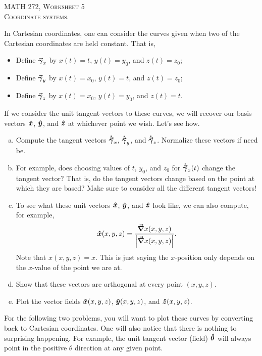 \documentclass[12pt]{article} %
\begin{document}
\begin{center}
   \textsc{\large MATH 272, Worksheet 5}\\
   \textsc{Coordinate systems.}
\end{center}
\vspace{.5cm}

\vspace*{1cm}
\begin{problem}
In Cartesian coordinates, one can consider the curves given when two of the Cartesian coordinates are held constant. That is,
\begin{itemize}
    \item Define $\boldsymbol{\vec{\gamma}}_x$ by $x(t)=t$, $y(t)=y_0$, and $z(t)=z_0$;
    \item Define $\boldsymbol{\vec{\gamma}}_y$ by $x(t)=x_0$, $y(t)=t$, and $z(t)=z_0$;
    \item Define $\boldsymbol{\vec{\gamma}}_z$ by $x(t)=x_0$, $y(t)=y_0$, and $z(t)=t$.
\end{itemize}
If we consider the unit tangent vectors to these curves, we will recover our basis vectors $\boldsymbol{\hat{x}}$, $\boldsymbol{\hat{y}}$, and $\boldsymbol{\hat{z}}$ at whichever point we wish.  Let's see how.
\begin{enumerate}[(a)]
    \item Compute the tangent vectors $\boldsymbol{\dot{\vec{\gamma}}}_x$, $\boldsymbol{\dot{\vec{\gamma}}}_y$, and $\boldsymbol{\dot{\vec{\gamma}}}_z$.  Normalize these vectors if need be.
    \item For example, does choosing values of $t$, $y_0$, and $z_0$ for $\boldsymbol{\dot{\vec{\gamma}}}_x(t)$ change the tangent vector? That is, do the tangent vectors change based on the point at which they are based? Make sure to consider all the different tangent vectors!
    \item To see what these unit vectors $\boldsymbol{\hat{x}}$, $\boldsymbol{\hat{y}}$, and $\boldsymbol{\hat{z}}$ look like, we can also compute, for example,
        \[
        \boldsymbol{\hat{x}}(x,y,z) = \frac{\boldsymbol{\vec{\nabla}} x(x,y,z)}{\left| \boldsymbol{\vec{\nabla}} x(x,y,z)\right|}.
        \]
        Note that $x(x,y,z)=x$. This is just saying the $x$-position only depends on the $x$-value of the point we are at.
    \item Show that these vectors are orthogonal at every point $(x,y,z)$.
    \item Plot the vector fields $\boldsymbol{\hat{x}}(x,y,z)$, $\boldsymbol{\hat{y}}(x,y,z)$, and $\boldsymbol{\hat{z}}(x,y,z)$.
\end{enumerate}
\end{problem}

\vspace*{1cm}
\begin{center}
For the following two problems, you will want to plot these curves by converting back to Cartesian coordinates.  One will also notice that there is nothing to surprising happening.  For example, the unit tangent vector (field) $\boldsymbol{\boldsymbol{\hat{\theta}}}$ will always point in the positive $\theta$ direction at any given point.
\end{center}
\end{document}
